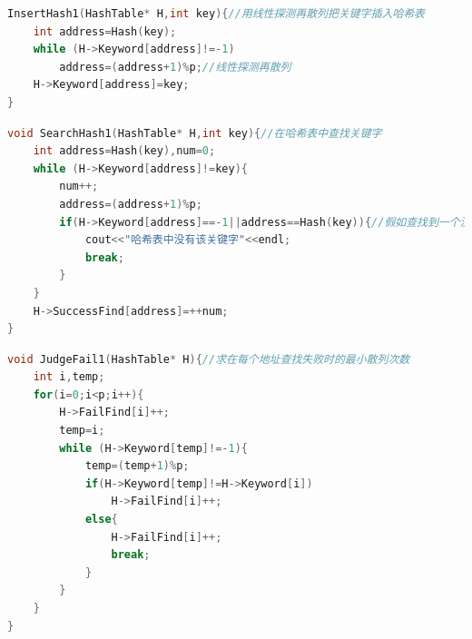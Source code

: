 \documentclass{ctexart}
\begin{document}
	\begin{lstlisting}[language=C++, caption=把关键字插入哈希表]
InsertHash1(HashTable* H,int key){//用线性探测再散列把关键字插入哈希表
    int address=Hash(key);
    while (H->Keyword[address]!=-1)
        address=(address+1)%p;//线性探测再散列
    H->Keyword[address]=key;
}
	\end{lstlisting}
	\begin{lstlisting}[language=C++, caption=在哈希表中查找关键字]
void SearchHash1(HashTable* H,int key){//在哈希表中查找关键字
	int address=Hash(key),num=0;
	while (H->Keyword[address]!=key){
		num++;
		address=(address+1)%p;
		if(H->Keyword[address]==-1||address==Hash(key)){//假如查找到一个没有关键字的位置或者查找了一圈回到原来的位置，说明哈希表中没有该关键字
			cout<<"哈希表中没有该关键字"<<endl;
			break;
		}
	}
	H->SuccessFind[address]=++num;
}
	\end{lstlisting}
	\begin{lstlisting}[language=C++, caption=求在每个地址查找失败时的最小散列次数]
void JudgeFail1(HashTable* H){//求在每个地址查找失败时的最小散列次数
    int i,temp;
    for(i=0;i<p;i++){
        H->FailFind[i]++;
        temp=i;
        while (H->Keyword[temp]!=-1){
            temp=(temp+1)%p;
            if(H->Keyword[temp]!=H->Keyword[i])
                H->FailFind[i]++;
            else{
                H->FailFind[i]++;
                break;
            }
        }
    }
}
	\end{lstlisting}
\end{document}
